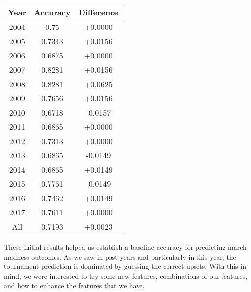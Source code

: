 \vspace{0.5cm}
\begin{tabular}{c c c}
    \toprule
    Year & Accuracy & Difference\\
    \midrule
    2004 & 0.75 & +0.0000\\
    2005 & 0.7343 & +0.0156\\
    2006 & 0.6875 & +0.0000\\
    2007 & 0.8281 & +0.0156\\
    2008 & 0.8281 & +0.0625\\
    2009 & 0.7656 & +0.0156\\
    2010 & 0.6718 & -0.0157\\
    2011 & 0.6865 & +0.0000\\
    2012 & 0.7313 & +0.0000\\
    2013 & 0.6865 & -0.0149\\
    2014 & 0.6865 & +0.0149\\
    2015 & 0.7761 & -0.0149\\
    2016 & 0.7462 & +0.0149\\
    2017 & 0.7611 & +0.0000\\
    All & 0.7193 & +0.0023\\
    \bottomrule
  \end{tabular}
  \vspace{0.5cm}

These initial results helped us establish a baseline accuracy for predicting march madness outcomes.
As we saw in past years and particularly in this year, the tournament prediction is dominated by guessing the correct upsets.
With this in mind, we were interested to try some new features, combinations of our features, and how to enhance the features that we have.